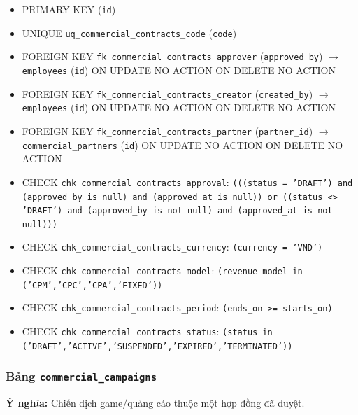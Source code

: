 \begin{itemize}

\item PRIMARY KEY (\texttt{id})

\item UNIQUE \texttt{uq\_commercial\_contracts\_code} (\texttt{code})

\item FOREIGN KEY \texttt{fk\_commercial\_contracts\_approver} (\texttt{approved\_by}) $\rightarrow$ \texttt{employees} (\texttt{id}) ON UPDATE NO ACTION ON DELETE NO ACTION

\item FOREIGN KEY \texttt{fk\_commercial\_contracts\_creator} (\texttt{created\_by}) $\rightarrow$ \texttt{employees} (\texttt{id}) ON UPDATE NO ACTION ON DELETE NO ACTION

\item FOREIGN KEY \texttt{fk\_commercial\_contracts\_partner} (\texttt{partner\_id}) $\rightarrow$ \texttt{commercial\_partners} (\texttt{id}) ON UPDATE NO ACTION ON DELETE NO ACTION

\item CHECK \texttt{chk\_commercial\_contracts\_approval}: \texttt{(((status = 'DRAFT') and (approved\_by is null) and (approved\_at is null)) or ((status <> 'DRAFT') and (approved\_by is not null) and (approved\_at is not null)))}

\item CHECK \texttt{chk\_commercial\_contracts\_currency}: \texttt{(currency = 'VND')}

\item CHECK \texttt{chk\_commercial\_contracts\_model}: \texttt{(revenue\_model in ('CPM','CPC','CPA','FIXED'))}

\item CHECK \texttt{chk\_commercial\_contracts\_period}: \texttt{(ends\_on >= starts\_on)}

\item CHECK \texttt{chk\_commercial\_contracts\_status}: \texttt{(status in ('DRAFT','ACTIVE','SUSPENDED','EXPIRED','TERMINATED'))}

\end{itemize}

\subsubsection{Bảng \texttt{commercial\_campaigns}}

\textbf{Ý nghĩa:} Chiến dịch game/quảng cáo thuộc một hợp đồng đã duyệt.\par

